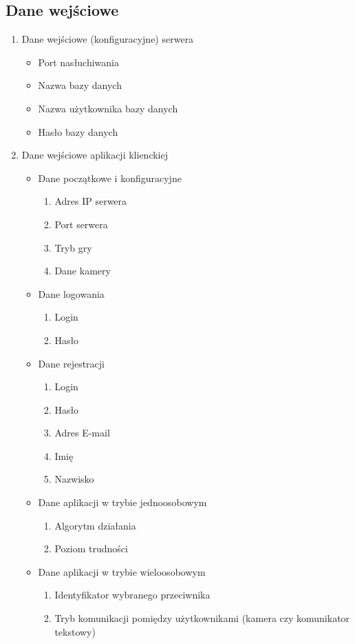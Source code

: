 \documentclass[12pt]{article}
\begin{document}
\subsection{Dane wejściowe}
\begin{enumerate}
\item Dane wejściowe (konfiguracyjne) serwera
\begin{itemize}
\item Port nasłuchiwania
\item Nazwa bazy danych
\item Nazwa użytkownika bazy danych
\item Hasło bazy danych
\end{itemize}
\item Dane wejściowe aplikacji klienckiej
\begin{itemize}
\item Dane początkowe i konfiguracyjne
\begin{enumerate}
\item Adres IP serwera
\item Port serwera
\item Tryb gry
\item Dane kamery
\end{enumerate}
\item Dane logowania 
\begin{enumerate}
\item Login
\item Hasło
\end{enumerate}
\item Dane rejestracji
\begin{enumerate}
\item Login
\item Hasło
\item Adres E-mail
\item Imię
\item Nazwisko
\end{enumerate}
\item Dane aplikacji w trybie jednoosobowym
\begin{enumerate}
\item Algorytm działania
\item Poziom trudności
\end{enumerate}
\item Dane aplikacji w trybie wieloosobowym
\begin{enumerate}
\item Identyfikator wybranego przeciwnika
\item Tryb komunikacji pomiędzy użytkownikami (kamera czy komunikator tekstowy)
\end{enumerate}
\end{itemize}
\end{enumerate}
\end{document}
